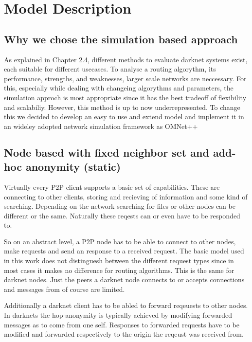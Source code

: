 \chapter{Model Description}

\section{Why we chose the simulation based approach}

As explained in Chapter 2.4, different methods to evaluate darknet systems exist, each suitable for different usecases. To analyse a routing algorythm, its performance, strengths, and weaknesses, larger scale networks are neccessary. For this, especially while dealing with changeing algorythms and parameters, the simulation approch is most appropriate since it has the best tradeoff of flexibility and scalabiliy. However, this method is up to now underrepresented. To change this we decided to develop an easy to use and extend model and implement it in an wideley adopted network simulation framework as OMNet++ 

\section{Node based with fixed neighbor set and add-hoc anonymity (static)}

Virtually every P2P client supports a basic set of capabilities. These are connecting to other clients, storing and recieving of information and some kind of searching. Depending on the network searching for files or other nodes can be different or the same. Naturally these reqests can or even have to be responded to.

So on an abstract level, a P2P node has to be able to connect to other nodes, make requests and send an response to a received request. The basic model used in this work does not distinguesh between the different request types since in most cases it makes no difference for routing algorithms. This is the same for darknet nodes. Just the peers a darknet node connects to or accepts connections and messages from of course are limited.

Additionally a darknet client has to be abled to forward reqeuests to other nodes. In darknets the hop-anonymity is typically achieved by modifying forwarded messages as to come from one self. Responses to forwarded requests have to be modified and forwarded respectively to the origin the reqeust was received from.

